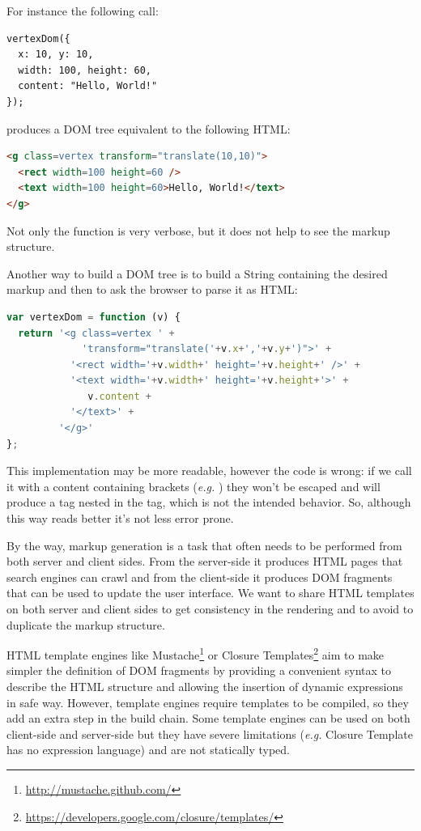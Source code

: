 \documentclass[american,english,runningheads]{llncs}
\newcommand{\eg}{\emph{e.g.}}
\begin{document}
For instance the following call:
\begin{lstlisting}
vertexDom({
  x: 10, y: 10,
  width: 100, height: 60,
  content: "Hello, World!"
});
\end{lstlisting}
produces a DOM tree equivalent to the following HTML:
\begin{lstlisting}[language=HTML]
<g class=vertex transform="translate(10,10)">
  <rect width=100 height=60 />
  <text width=100 height=60>Hello, World!</text>
</g>
\end{lstlisting}

Not only the  function is very verbose, but it does not help to see the markup structure.

Another way to build a DOM tree is to build a String containing the desired markup and then to ask the browser to parse it as HTML:

\begin{lstlisting}[language=JavaScript]
var vertexDom = function (v) {
  return '<g class=vertex ' +
             'transform="translate('+v.x+','+v.y+')">' +
           '<rect width='+v.width+' height='+v.height+' />' +
           '<text width='+v.width+' height='+v.height+'>' +
              v.content +
           '</text>' +
         '</g>'
};
\end{lstlisting}

This implementation may be more readable, however the code is wrong: if we call it with a content containing brackets (\eg{} ) they won’t be escaped and will produce a  tag nested in the  tag, which is not the intended behavior. So, although this way reads better it’s not less error prone.

By the way, markup generation is a task that often needs to be performed from both server and client sides. From the server-side it produces HTML pages that search engines can crawl and from the client-side it produces DOM fragments that can be used to update the user interface. We want to share HTML templates on both server and client sides to get consistency in the rendering and to avoid to duplicate the markup structure.

HTML template engines like Mustache\footnote{\href{http://mustache.github.com/}{http://mustache.github.com/}} or Closure Templates\footnote{\href{https://developers.google.com/closure/templates/}{https://developers.google.com/closure/templates/}} aim to make simpler the definition of DOM fragments by providing a convenient syntax to describe the HTML structure and allowing the insertion of dynamic expressions in safe way. However, template engines require templates to be compiled, so they add an extra step in the build chain. Some template engines can be used on both client-side and server-side but they have severe limitations (\eg{} Closure Template has no expression language) and are not statically typed.
\end{document}
